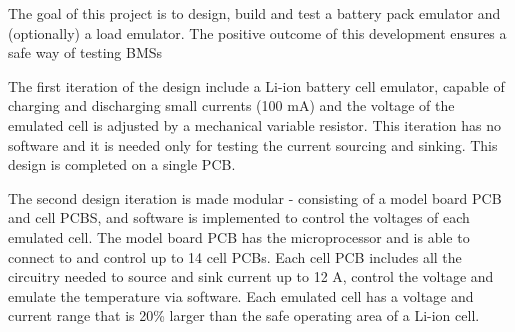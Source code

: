 \IEEEPARstart
{T}{he} goal of this project is to design, build and test a battery pack emulator and (optionally)
a load emulator. The positive outcome of this development ensures a safe way of testing BMSs


The first iteration of the design include a Li-ion battery cell emulator, capable of charging and discharging small currents (100 mA) and
the voltage of the emulated cell is adjusted by a mechanical variable resistor. This iteration has no software and it is needed only for 
testing the current sourcing and sinking. This design is completed on a single PCB.

The second design iteration is made modular - consisting of a model board PCB and cell PCBS, and software is implemented to control the 
voltages of each emulated cell. The model board PCB has the microprocessor and is able to connect to and control up to 14 cell PCBs. Each
cell PCB includes all the circuitry needed to source and sink current up to 12 A, control the voltage and emulate the temperature via software.
Each emulated cell has a voltage and current range that is 20\% larger than the safe operating area of a Li-ion cell.





 



